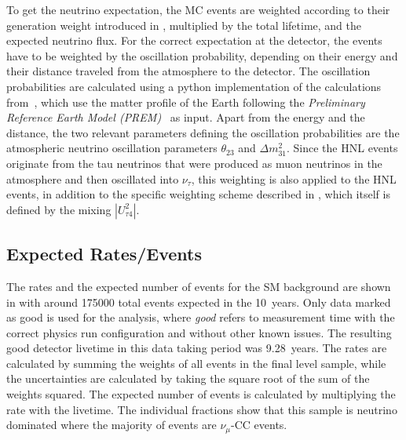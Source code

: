 To get the neutrino expectation, the MC events are weighted according to their generation weight introduced in , multiplied by the total lifetime, and the expected neutrino flux. For the correct expectation at the detector, the events have to be weighted by the oscillation probability, depending on their energy and their distance traveled from the atmosphere to the detector. The oscillation probabilities are calculated using a python implementation of the calculations from~, which use the matter profile of the Earth following the \textit{Preliminary Reference Earth Model (PREM)}~ as input. Apart from the energy and the distance, the two relevant parameters defining the oscillation probabilities are the atmospheric neutrino oscillation parameters $\theta_{23}$ and $\Delta m^{2}_{31}$. Since the HNL events originate from the tau neutrinos that were produced as muon neutrinos in the atmosphere and then oscillated into $\nu_\tau$, this weighting is also applied to the HNL events, in addition to the specific weighting scheme described in , which itself is defined by the mixing $|U_{\tau4}^2|$.


\subsection{Expected Rates/Events}

The rates and the expected number of events for the SM background are shown in  with around 175000 total events expected in the \SI{10}{years}. Only data marked as good is used for the analysis, where \textit{good} refers to measurement time with the correct physics run configuration and without other known issues. The resulting good detector livetime in this data taking period was \SI{9.28}{years}. The rates are calculated by summing the weights of all events in the final level sample, while the uncertainties are calculated by taking the square root of the sum of the weights squared. The expected number of events is calculated by multiplying the rate with the livetime. The individual fractions show that this sample is neutrino dominated where the majority of events are $\nu_\mu$-CC events.

